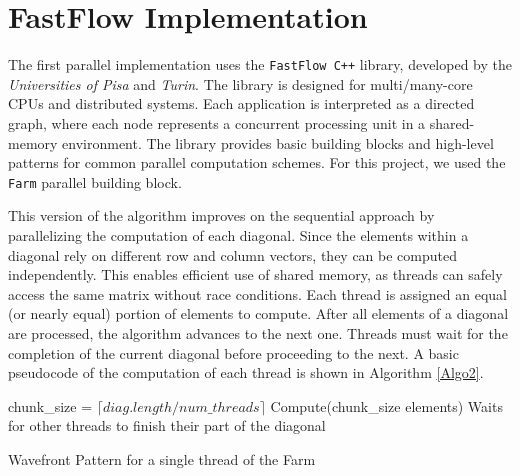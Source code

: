 \section*{FastFlow Implementation}
The first parallel implementation uses the \texttt{FastFlow C++} library, developed by the \textit{Universities of Pisa} and \textit{Turin}. The library is designed for multi/many-core CPUs and distributed systems. Each application is interpreted as a directed graph, where each node represents a concurrent processing unit in a shared-memory environment. The library provides basic building blocks and high-level patterns for common parallel computation schemes. For this project, we used the \texttt{Farm} parallel building block.

\par This version of the algorithm improves on the sequential approach by parallelizing the computation of each diagonal. Since the elements within a diagonal rely on different row and column vectors, they can be computed independently. This enables efficient use of shared memory, as threads can safely access the same matrix without race conditions. Each thread is assigned an equal (or nearly equal) portion of elements to compute. After all elements of a diagonal are processed, the algorithm advances to the next one. Threads must wait for the completion of the current diagonal before proceeding to the next. A basic pseudocode of the computation of each thread is shown in Algorithm \ref{Algo2}.

\begin{algorithm}
\begin{algorithmic}
    \STATE chunk\_size = $\lceil diag.length / num\_threads \rceil$
    \STATE Compute(chunk\_size elements)
    \STATE Waits for other threads to finish their part of the diagonal
\ENDFOR
\end{algorithmic}
\caption{Wavefront Pattern for a single thread of the Farm}
\label{Algo2}
\end{algorithm}

